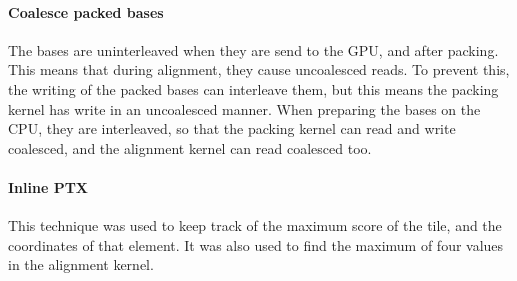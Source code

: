 \documentclass[../main/thesis.tex]{subfiles}
\begin{document}
\paragraph{Coalesce packed bases}
The bases are uninterleaved when they are send to the GPU, and after packing.
This means that during alignment, they cause uncoalesced reads.
To prevent this, the writing of the packed bases can interleave them, but this means the packing kernel has write in an uncoalesced manner.
When preparing the bases on the CPU, they are interleaved, so that the packing kernel can read and write coalesced, and the alignment kernel can read coalesced too.

\paragraph{Inline PTX}
This technique was used to keep track of the maximum score of the tile, and the coordinates of that element.
It was also used to find the maximum of four values in the alignment kernel.
\end{document}
